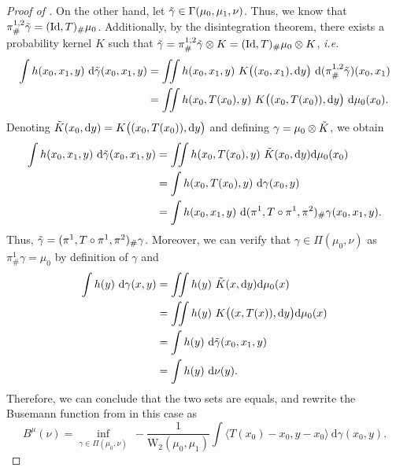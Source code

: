 \documentclass[twoside]{article}
\newcommand{\W}{\mathrm{W}}
\newcommand{\id}{\mathrm{Id}}
\begin{document}
\begin{proof}[Proof of ]
    On the other hand, let $\Tilde{\gamma}\in\Gamma(\mu_0,\mu_1,\nu)$. Thus, we know that $\pi^{1,2}_\#\Tilde{\gamma}=(\id, T)_\#\mu_0$. Additionally, by the disintegration theorem, there exists a probability kernel $K$ such that $\Tilde{\gamma}=\pi^{1,2}_\#\Tilde{\gamma} \otimes K = (\id, T)_\#\mu_0 \otimes K$, \emph{i.e.}
    \begin{equation}
        \begin{aligned}
            \int h(x_0,x_1,y)\ \mathrm{d}\Tilde{\gamma}(x_0,x_1,y) &= \iint h(x_0,x_1,y)\ K\big((x_0, x_1), \mathrm{d}y\big)\ \mathrm{d}(\pi^{1,2}_\#\Tilde{\gamma})(x_0,x_1) \\
            &= \iint h(x_0, T(x_0), y)\ K\big((x_0, T(x_0)), \mathrm{d}y\big)\ \mathrm{d}\mu_0(x_0).
        \end{aligned}
    \end{equation}
    Denoting $\Tilde{K}(x_0,\mathrm{d}y)=K\big((x_0, T(x_0)), \mathrm{d}y\big)$ and defining $\gamma=\mu_0\otimes \Tilde{K}$, we obtain
    \begin{equation}
        \begin{aligned}
            \int h(x_0,x_1,y) \ \mathrm{d}\Tilde{\gamma}(x_0,x_1,y) &= \iint h(x_0, T(x_0), y)\ \Tilde{K}(x_0,\mathrm{d}y)\mathrm{d}\mu_0(x_0) \\
            &= \int h(x_0, T(x_0), y)\ \mathrm{d}\gamma(x_0, y) \\
            &= \int h(x_0,x_1,y)\ \mathrm{d}(\pi^1,T\circ\pi^1,\pi^2)_\#\gamma(x_0,x_1,y).
        \end{aligned}
    \end{equation}
    Thus, $\Tilde{\gamma} = (\pi^1, T\circ \pi^1, \pi^2)_\#\gamma$. Moreover, we can verify that $\gamma\in \Pi(\mu_0,\nu)$ as $\pi^1_\#\gamma=\mu_0$ by definition of $\gamma$ and 
    \begin{equation}
        \begin{aligned}
            \int h(y)\ \mathrm{d}\gamma(x,y) &= \iint h(y)\ \Tilde{K}(x, \mathrm{d}y)\mathrm{d}\mu_0(x) \\
            &= \iint h(y) \ K\big((x, T(x)), \mathrm{d}y\big)\mathrm{d}\mu_0(x) \\
            &= \int h(y)\ \mathrm{d}\Tilde{\gamma}(x_0,x_1,y) \\
            &= \int h(y)\ \mathrm{d}\nu(y).
        \end{aligned}
    \end{equation}
    Therefore, we can conclude that the two sets are equals, and rewrite the Busemann function from  in this case as 
    \begin{equation}
        B^\mu(\nu) = \inf_{\gamma\in\Pi(\mu_0,\nu)}\ -\frac{1}{\W_2(\mu_0,\mu_1)} \int \langle T(x_0)-x_0, y-x_0\rangle\ \mathrm{d}\gamma(x_0,y).
    \end{equation}
\end{proof}
\end{document}
